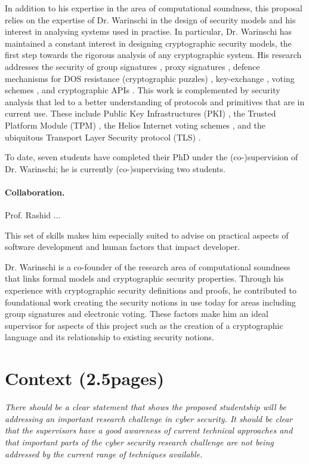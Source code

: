 \documentclass[10pt]{article}
\begin{document}
In addition to his expertise in the area of computational soundness, this proposal relies on the expertise of Dr. Warinschi in the design of security models and his interest in analysing systems used in practise.
In particular, Dr. Warinschi has maintained a constant interest in designing cryptographic security models, the first step towards the rigorous analysis of any cryptographic system. 
His research addresses the security of group signatures \cite{BMW03}, proxy signatures \cite{proxies}, defence mechanisms for DOS resistance (cryptographic puzzles) \cite{puzzles},  key-exchange \cite{ke}, voting schemes \cite{helios}, and cryptographic APIs \cite{KSW11}.
This work is complemented by security analysis that led to a better understanding of protocols and primitives that are in current use.  These include Public Key Infrastructures (PKI) \cite{boldyreva07acloser}, the Trusted Platform Module (TPM) \cite{pcas}, the Helios Internet voting schemes \cite{helios}, and the ubiquitous Transport Layer Security protocol (TLS) \cite{tls}. 



To date, seven students have completed their PhD under the (co-)supervision of Dr. Warinschi; he is currently (co-)supervising two 
students.


\paragraph{Collaboration.}
Prof. Rashid  ...


This set of skills makes him especially suited to advise on practical aspects of software development and human factors that impact developer.

Dr. Warinschi is a co-founder of the research area of computational soundness that links formal models and cryptographic security properties. Through his experience with cryptographic security definitions and proofs, he contributed to foundational work creating the security notions in use today for areas including group signatures and electronic voting. 
These factors make him an ideal supervisor for aspects of this project such as the creation of a cryptographic language and its relationship to existing security notions.


\section{Context (2.5pages)}
\emph{There should be a clear statement that shows the proposed studentship will be addressing an important research challenge in cyber security. It should be clear that the supervisors have a good awareness of current technical approaches and that important parts of the cyber security research challenge are not being addressed by the current range of techniques available.}
\end{document}
